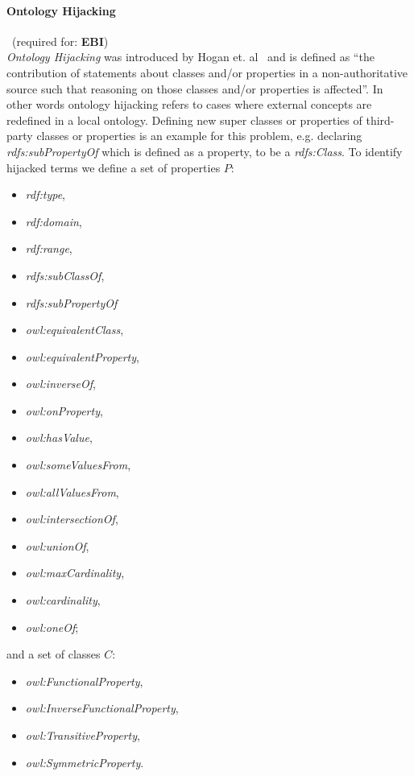 \paragraph{Ontology Hijacking}~(required for: \textbf{EBI})~\\
\emph{Ontology Hijacking} was introduced by Hogan et. al~\cite{Hogan08} and is defined as ``the contribution of statements about classes and/or properties in a non-authoritative source such that reasoning on those classes and/or properties is affected''. 
In other words ontology hijacking refers to cases where external concepts are redefined in a local ontology.
Defining new super classes or properties of third-party classes or properties is an example for this problem, e.g. declaring \textit{rdfs:subPropertyOf} which is defined as a property, to be a \textit{rdfs:Class}. 
To identify hijacked terms  we define a set of properties $P$:
\begin{itemize}
\item\textit{rdf:type}, \item\textit{rdf:domain}, \item\textit{rdf:range}, \item\textit{rdfs:subClassOf}, \item\textit{rdfs:subPropertyOf}\item\textit{owl:equivalentClass}, \item\textit{owl:equivalentProperty}, \item\textit{owl:inverseOf}, \item\textit{owl:onProperty}, \item\textit{owl:hasValue}, \item\textit{owl:someValuesFrom}, \item\textit{owl:allValuesFrom}, \item\textit{owl:intersectionOf}, \item\textit{owl:unionOf}, \item\textit{owl:maxCardinality}, \item\textit{owl:cardinality}, \item\textit{owl:oneOf};
\end{itemize}
and a set of classes $C$: 
\begin{itemize}
\item\textit{owl:FunctionalProperty}, \item\textit{owl:InverseFunctionalProperty}, \item\textit{owl:TransitiveProperty}, \item\textit{owl:SymmetricProperty}.
\end{itemize}
